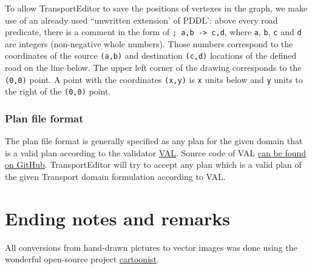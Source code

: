 \documentclass[10pt,a4paper,oneside]{article}
\newcommand{\TODO}[1]{{\textbf{TODO:} #1}} %
\newcommand{\pname}{TransportEditor} %
\begin{document}
To allow \pname{} to save the positions of vertexes in the graph, we make use of an already used ``unwritten extension' of PDDL':
above every road predicate, there is a comment in the form of \verb+; a,b -> c,d+,
where \verb+a+, \verb+b+, \verb+c+ and \verb+d+ are integers (non-negative whole numbers).
Those numbers correspond to the coordinates of the source \verb+(a,b)+ and destination \verb+(c,d)+ locations of the defined road on the line below. The upper left corner of the drawing corresponds to the \verb+(0,0)+ point. A point with the coordinates \verb+(x,y)+ is \verb+x+ units below and \verb+y+ units to the right of the \verb+(0,0)+ point.

\subsubsection{Plan file format}\label{plan-format}

The plan file format is generally specified as any plan for the given domain that is a valid plan according to the validator \href{http://www.inf.kcl.ac.uk/research/groups/PLANNING/index.php?option=com_content&view=article&id=70&Itemid=77}{VAL}. Source code of VAL \href{https://github.com/KCL-Planning/VAL}{can be found on GitHub}. \pname{} will try to accept any plan which is a valid plan of the given Transport domain formulation according to VAL.

\section{Ending notes and remarks}

All conversions from hand-drawn pictures to vector images was done using the wonderful
open-source project \href{https://github.com/honzajavorek/cartoonist}{cartoonist}.





{
\footnotesize %
%
}
\end{document}
